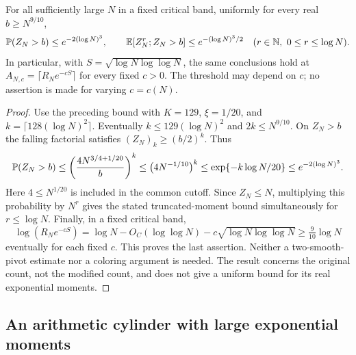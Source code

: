 \begin{proposition}
\label{p1:limits:colored-tail}
For all sufficiently large $N$ in a fixed critical band, uniformly
for every real $b\ge N^{9/10}$,
\begin{equation}
 \P(Z_N>b)\le e^{-2(\log N)^3},\qquad
 \E[Z_N^r;Z_N>b]\le e^{-(\log N)^3/2}
       \quad(r\in\mathbb N,\ 0\le r\le\log N).
 \label{p1:limits:colored-tail-bound}
\end{equation}
In particular, with $S=\sqrt{\log N\log\log N}$, the same conclusions
hold at $A_{N,c}=\lceil R_Ne^{-cS}\rceil$ for every fixed $c>0$.
The threshold may depend on $c$; no assertion is made for varying
$c=c(N)$.
\end{proposition}
\begin{proof}
Use the preceding bound with $K=129$, $\xi=1/20$, and
$k=\lceil128(\log N)^2\rceil$. Eventually
$k\le129(\log N)^2$ and $2k\le N^{9/10}$.
On $Z_N>b$ the falling factorial satisfies
$(Z_N)_k\ge(b/2)^k$. Thus
\[
 \P(Z_N>b)
 \le\left(\frac{4N^{3/4+1/20}}b\right)^k
 \le\bigl(4N^{-1/10}\bigr)^k
 \le\exp\{-k\log N/20\}
 \le e^{-2(\log N)^3}.
\]
Here $4\le N^{1/20}$ is included in the common cutoff.
Since $Z_N\le N$, multiplying this probability by $N^r$ gives
the stated truncated-moment bound simultaneously for $r\le\log N$.
Finally, in a fixed critical band,
\[
 \log(R_Ne^{-cS})
   =\log N-O_C(\log\log N)-c\sqrt{\log N\log\log N}
   \ge\tfrac9{10}\log N
\]
eventually for each fixed $c$. This proves the last assertion.
Neither a two-smooth-pivot estimate nor a coloring argument is needed.
The result concerns the original count, not the modified count, and
does not give a uniform bound for its real exponential moments.
\end{proof}

\subsection{An arithmetic cylinder with large exponential moments}


